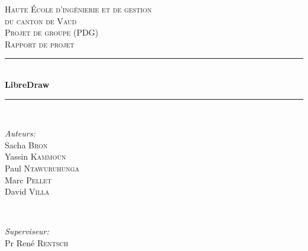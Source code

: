 \documentclass[11pt,a4paper,oldfontcommands]{memoir}
\begin{document}
\begin{titlepage}

\newcommand{\HRule}{\rule{\linewidth}{0.5mm}}

\center
 

\textsc{\LARGE Haute École d'ingénierie et de gestion \\du canton de Vaud}\\[1.5cm]
\textsc{\Large Projet de groupe (PDG)}\\[0.5cm]
\textsc{\large Rapport de projet}\\[0.5cm]


\HRule \\[0.8cm]
{ \huge \bfseries LibreDraw}\\[0.4cm]
\HRule \\[1.5cm]
 

\begin{minipage}{0.4\textwidth}
\begin{flushleft} \large
\emph{Auteurs:}\\
Sacha \textsc{Bron}\\
Yassin \textsc{Kammoun}\\
Paul \textsc{Ntawuruhunga}\\
Marc \textsc{Pellet}\\
David \textsc{Villa}
\end{flushleft}
\end{minipage}
~
\begin{minipage}{0.4\textwidth}
\begin{flushright} \large
\emph{Superviseur:} \\
Pr René \textsc{Rentsch} 
\break 
\break 
\break 
\break 
\end{flushright}
\end{minipage}\\[4cm]


\end{titlepage}
\end{document}
